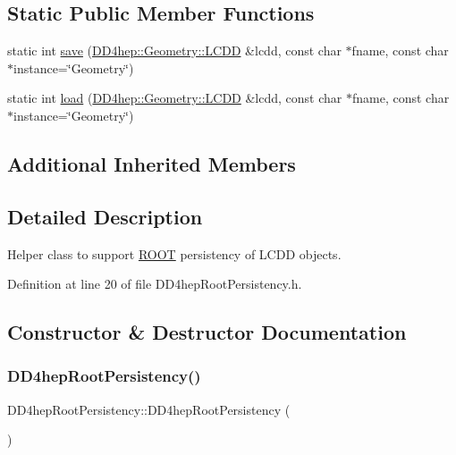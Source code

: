 \subsection*{Static Public Member Functions}
\begin{DoxyCompactItemize}
\item 
static int \hyperlink{class_d_d4hep_root_persistency_a29e9e5f5a15dd597278c5960d25c69f3}{save} (\hyperlink{class_d_d4hep_1_1_geometry_1_1_l_c_d_d}{D\+D4hep\+::\+Geometry\+::\+L\+C\+DD} \&lcdd, const char $\ast$fname, const char $\ast$instance=\char`\"{}Geometry\char`\"{})
\item 
static int \hyperlink{class_d_d4hep_root_persistency_a01f849c58fac51a46b47bcaf18fb87cf}{load} (\hyperlink{class_d_d4hep_1_1_geometry_1_1_l_c_d_d}{D\+D4hep\+::\+Geometry\+::\+L\+C\+DD} \&lcdd, const char $\ast$fname, const char $\ast$instance=\char`\"{}Geometry\char`\"{})
\end{DoxyCompactItemize}
\subsection*{Additional Inherited Members}


\subsection{Detailed Description}
Helper class to support \hyperlink{namespace_r_o_o_t}{R\+O\+OT} persistency of L\+C\+DD objects. 

Definition at line 20 of file D\+D4hep\+Root\+Persistency.\+h.



\subsection{Constructor \& Destructor Documentation}
\hypertarget{class_d_d4hep_root_persistency_ac24a71ad3ca37110b7cb0b4f36abc300}{}\label{class_d_d4hep_root_persistency_ac24a71ad3ca37110b7cb0b4f36abc300} 
\subsubsection{\texorpdfstring{D\+D4hep\+Root\+Persistency()}{DD4hepRootPersistency()}}
{\footnotesize\ttfamily D\+D4hep\+Root\+Persistency\+::\+D\+D4hep\+Root\+Persistency (\begin{DoxyParamCaption}{ }\end{DoxyParamCaption})\hspace{0.3cm}{\ttfamily [inline]}}



